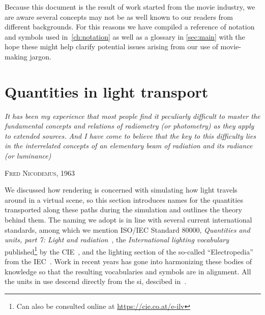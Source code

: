 Because this document is the result of work started from the movie industry, 
we are aware several concepts may not be as well known to our readers from different backgrounds. 
For this reasons we have compiled a reference of notation and symbols used in~\cref{ch:notation} 
as well as a glossary in \cref{sec:main} with the hope these might help clarify potential issues arising 
from our use of movie-making jargon.

\section{Quantities in light transport}
\epigraph{%
	\emph{It has been	my experience that most people find it peculiarly difficult to master 
	the fundamental concepts and relations of radiometry (or photometry) as they apply 
	to extended sources. And I have come to believe that the key to this difficulty 
	lies in the interrelated concepts of an elementary beam of radiation and its 
	radiance (or luminance)}}{\textsc{Fred Nicodemus}, 1963}

\noindent We discussed how \gls{rendering} is concerned with simulating how light travels around in 
a \gls{virtual scene}, so this section introduces names for the quantities transported 
along these paths during the simulation and outlines the theory behind them. 
The naming we adopt is in line with several current international standards, 
among which we mention ISO/IEC Standard 80000, 
\emph{Quantities and units, part 7: Light and radiation}~\cite{iso:80000-7:2019}, 
the \emph{International lighting vocabulary} published\footnote{Can also be consulted 
	online at \url{https://cie.co.at/e-ilv}} by the \gls{CIE}~\cite{cie:s017.2020},
and the lighting section of the so-called ``Electropedia'' from the \gls{IEC}~\cite{iec:60050-845:2020}.
Work in recent years has gone into harmonizing these bodies of knowledge so that the resulting 
vocabularies and symbols are in alignment. All the units in use descend directly
from the \gls{si}, descibed in~\cite{bipm:si.2019}.

